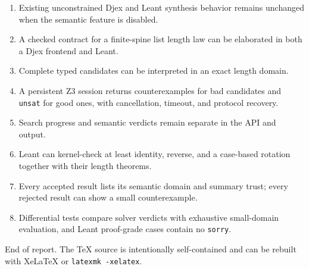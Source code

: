 \documentclass[11pt,oneside]{article}
\newcommand{\code}[1]{\texttt{#1}}
\begin{document}
\begin{soundbox}[title=Definition of a successful first release]
\begin{enumerate}
  \item Existing unconstrained Djex and Leant synthesis behavior remains unchanged when
        the semantic feature is disabled.
  \item A checked contract for a finite-spine list length law can be elaborated in both
        a Djex frontend and Leant.
  \item Complete typed candidates can be interpreted in an exact length domain.
  \item A persistent Z3 session returns counterexamples for bad candidates and
        \code{unsat} for good ones, with cancellation, timeout, and protocol recovery.
  \item Search progress and semantic verdicts remain separate in the API and output.
  \item Leant can kernel-check at least identity, reverse, and a case-based rotation
        together with their length theorems.
  \item Every accepted result lists its semantic domain and summary trust; every
        rejected result can show a small counterexample.
  \item Differential tests compare solver verdicts with exhaustive small-domain
        evaluation, and Leant proof-grade cases contain no \code{sorry}.
\end{enumerate}
\end{soundbox}

\vfill
\begin{center}
{\small\sffamily\color{Muted}
End of report. The TeX source is intentionally self-contained and can be rebuilt with
XeLaTeX or \code{latexmk -xelatex}.}
\end{center}
\end{document}
